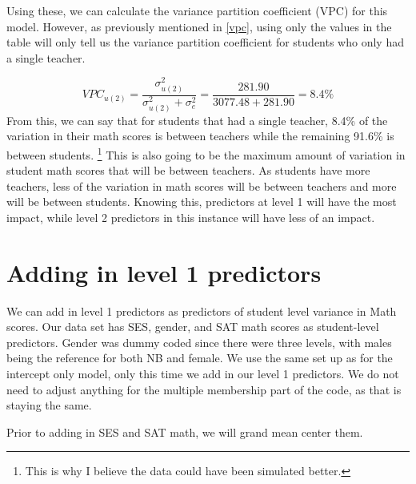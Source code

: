 \documentclass[
]{book}
\newenvironment{Shaded}{\begin{snugshade}}{\end{snugshade}}
\newcommand{\AttributeTok}[1]{\textcolor[rgb]{0.77,0.63,0.00}{#1}}
\newcommand{\FunctionTok}[1]{\textcolor[rgb]{0.00,0.00,0.00}{#1}}
\newcommand{\NormalTok}[1]{#1}
\newcommand{\OtherTok}[1]{\textcolor[rgb]{0.56,0.35,0.01}{#1}}
\newcommand{\SpecialCharTok}[1]{\textcolor[rgb]{0.00,0.00,0.00}{#1}}
\newcommand{\StringTok}[1]{\textcolor[rgb]{0.31,0.60,0.02}{#1}}
\begin{document}
Using these, we can calculate the variance partition coefficient (VPC) for this model. However, as previously mentioned in \ref{vpc}, using only the values in the table will only tell us the variance partition coefficient for students who only had a single teacher.

\[VPC_{u(2)} = \frac{\sigma_{u(2)}^{2}}{\sigma_{u(2)}^{2} + \sigma_{e}^{2}} = \frac{281.90}{3077.48 + 281.90} = 8.4\%\]
From this, we can say that for students that had a single teacher, 8.4\% of the variation in their math scores is between teachers while the remaining 91.6\% is between students. \footnote{This is why I believe the data could have been simulated better.} This is also going to be the maximum amount of variation in student math scores that will be between teachers. As students have more teachers, less of the variation in math scores will be between teachers and more will be between students. Knowing this, predictors at level 1 will have the most impact, while level 2 predictors in this instance will have less of an impact.

\hypertarget{adding-in-level-1-predictors}{%
\section{Adding in level 1 predictors}\label{adding-in-level-1-predictors}}

We can add in level 1 predictors as predictors of student level variance in Math scores. Our data set has SES, gender, and SAT math scores as student-level predictors. Gender was dummy coded since there were three levels, with males being the reference for both NB and female. We use the same set up as for the intercept only model, only this time we add in our level 1 predictors. We do not need to adjust anything for the multiple membership part of the code, as that is staying the same.

Prior to adding in SES and SAT math, we will grand mean center them.

\begin{Shaded}
\end{Shaded}
\end{document}
